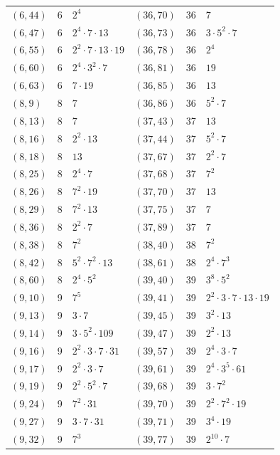 \documentclass[11pt]{article}
\begin{document}
\begin{longtable}{@{}lrl@{\qquad}lrl@{}}
$(6,44)$ & 6 & $2^{4}$ & $(36,70)$ & 36 & $7$\\
$(6,47)$ & 6 & $2^{4}\cdot 7\cdot 13$ & $(36,73)$ & 36 & $3\cdot 5^{2}\cdot 7$\\
$(6,55)$ & 6 & $2^{2}\cdot 7\cdot 13\cdot 19$ & $(36,78)$ & 36 & $2^{4}$\\
$(6,60)$ & 6 & $2^{4}\cdot 3^{2}\cdot 7$ & $(36,81)$ & 36 & $19$\\
$(6,63)$ & 6 & $7\cdot 19$ & $(36,85)$ & 36 & $13$\\
$(8,9)$ & 8 & $7$ & $(36,86)$ & 36 & $5^{2}\cdot 7$\\
$(8,13)$ & 8 & $7$ & $(37,43)$ & 37 & $13$\\
$(8,16)$ & 8 & $2^{2}\cdot 13$ & $(37,44)$ & 37 & $5^{2}\cdot 7$\\
$(8,18)$ & 8 & $13$ & $(37,67)$ & 37 & $2^{2}\cdot 7$\\
$(8,25)$ & 8 & $2^{4}\cdot 7$ & $(37,68)$ & 37 & $7^{2}$\\
$(8,26)$ & 8 & $7^{2}\cdot 19$ & $(37,70)$ & 37 & $13$\\
$(8,29)$ & 8 & $7^{2}\cdot 13$ & $(37,75)$ & 37 & $7$\\
$(8,36)$ & 8 & $2^{2}\cdot 7$ & $(37,89)$ & 37 & $7$\\
$(8,38)$ & 8 & $7^{2}$ & $(38,40)$ & 38 & $7^{2}$\\
$(8,42)$ & 8 & $5^{2}\cdot 7^{2}\cdot 13$ & $(38,61)$ & 38 & $2^{4}\cdot 7^{3}$\\
$(8,60)$ & 8 & $2^{4}\cdot 5^{2}$ & $(39,40)$ & 39 & $3^{8}\cdot 5^{2}$\\
$(9,10)$ & 9 & $7^{5}$ & $(39,41)$ & 39 & $2^{2}\cdot 3\cdot 7\cdot 13\cdot 19$\\
$(9,13)$ & 9 & $3\cdot 7$ & $(39,45)$ & 39 & $3^{2}\cdot 13$\\
$(9,14)$ & 9 & $3\cdot 5^{2}\cdot 109$ & $(39,47)$ & 39 & $2^{2}\cdot 13$\\
$(9,16)$ & 9 & $2^{2}\cdot 3\cdot 7\cdot 31$ & $(39,57)$ & 39 & $2^{4}\cdot 3\cdot 7$\\
$(9,17)$ & 9 & $2^{2}\cdot 3\cdot 7$ & $(39,61)$ & 39 & $2^{4}\cdot 3^{5}\cdot 61$\\
$(9,19)$ & 9 & $2^{2}\cdot 5^{2}\cdot 7$ & $(39,68)$ & 39 & $3\cdot 7^{2}$\\
$(9,24)$ & 9 & $7^{2}\cdot 31$ & $(39,70)$ & 39 & $2^{2}\cdot 7^{2}\cdot 19$\\
$(9,27)$ & 9 & $3\cdot 7\cdot 31$ & $(39,71)$ & 39 & $3^{4}\cdot 19$\\
$(9,32)$ & 9 & $7^{3}$ & $(39,77)$ & 39 & $2^{10}\cdot 7$\\

\end{longtable}
\end{document}
